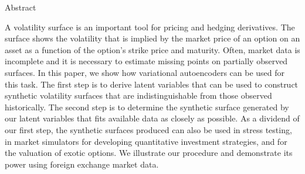 \documentclass[12pt]{article}
\begin{document}
\begin{center}
  {Abstract}
\end{center}

A volatility surface is an important tool for pricing and hedging derivatives. The surface shows the volatility that is implied by the market price of an option on an asset as a function of the option's strike price and maturity. Often, market data is incomplete and it is necessary to estimate missing points on partially observed surfaces. In this paper, we show how variational autoencoders can be used for this task. The first step is to derive latent variables that can be used to construct synthetic volatility surfaces that  are indistinguishable from those observed historically. The second step is to determine the synthetic surface generated by our latent variables that fits available data as closely as possible. As a dividend of our first step, the synthetic surfaces produced can also be used in stress testing, in market simulators for developing quantitative investment strategies,  and for the valuation of exotic options. We illustrate our procedure and demonstrate its power using foreign exchange market data.  


\end{document}

